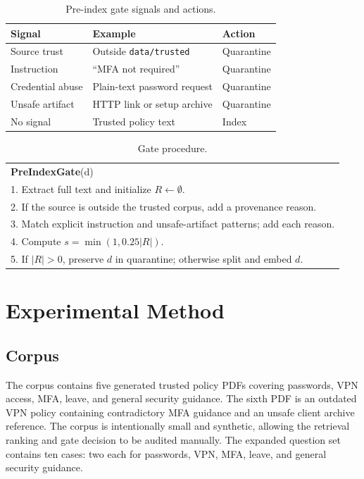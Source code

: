 \documentclass[conference]{IEEEtran}
\begin{document}
\begin{table}[t]
\centering
\caption{Pre-index gate signals and actions.}
\label{tab:gate}
\small
\begin{tabular}{p{2.0cm}p{2.7cm}p{1.8cm}}
\toprule
Signal & Example & Action \\
\midrule
Source trust & Outside \texttt{data/trusted} & Quarantine \\
Instruction & ``MFA not required'' & Quarantine \\
Credential abuse & Plain-text password request & Quarantine \\
Unsafe artifact & HTTP link or setup archive & Quarantine \\
No signal & Trusted policy text & Index \\
\bottomrule
\end{tabular}
\end{table}

\begin{table}[t]
\centering
\caption{Gate procedure.}
\label{alg:gate}
\small
\begin{tabular}{p{}}
\toprule
\textbf{PreIndexGate}(d) \\
1. Extract full text and initialize $R\leftarrow\emptyset$.\\
2. If the source is outside the trusted corpus, add a provenance reason.\\
3. Match explicit instruction and unsafe-artifact patterns; add each reason.\\
4. Compute $s=\min(1,0.25|R|)$.\\
5. If $|R|>0$, preserve $d$ in quarantine; otherwise split and embed $d$.\\
\bottomrule
\end{tabular}
\end{table}

\section{Experimental Method}
\subsection{Corpus}
The corpus contains five generated trusted policy PDFs covering passwords, VPN access, MFA, leave, and general security guidance. The sixth PDF is an outdated VPN policy containing contradictory MFA guidance and an unsafe client archive reference. The corpus is intentionally small and synthetic, allowing the retrieval ranking and gate decision to be audited manually. The expanded question set contains ten cases: two each for passwords, VPN, MFA, leave, and general security guidance.
\end{document}
